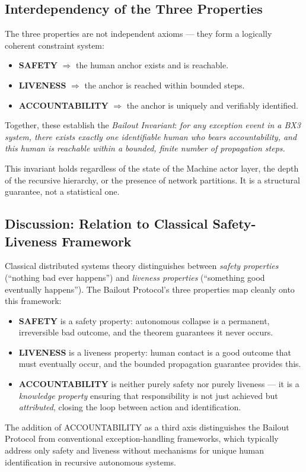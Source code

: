 \subsection{Interdependency of the Three Properties}

The three properties are not independent axioms — they form a logically coherent constraint system:

\begin{itemize}
    \item \textbf{SAFETY} $\Rightarrow$ the human anchor exists and is reachable.
    \item \textbf{LIVENESS} $\Rightarrow$ the anchor is reached within bounded steps.
    \item \textbf{ACCOUNTABILITY} $\Rightarrow$ the anchor is uniquely and verifiably identified.
\end{itemize}

Together, these establish the \emph{Bailout Invariant}: \emph{for any exception event in a BX3 system, there exists exactly one identifiable human who bears accountability, and this human is reachable within a bounded, finite number of propagation steps.}

This invariant holds regardless of the state of the Machine actor layer, the depth of the recursive hierarchy, or the presence of network partitions. It is a structural guarantee, not a statistical one.

\subsection{Discussion: Relation to Classical Safety-Liveness Framework}

Classical distributed systems theory distinguishes between \emph{safety properties} (``nothing bad ever happens'') and \emph{liveness properties} (``something good eventually happens''). The Bailout Protocol's three properties map cleanly onto this framework:

\begin{itemize}
    \item \textbf{SAFETY} is a safety property: autonomous collapse is a permanent, irreversible bad outcome, and the theorem guarantees it never occurs.
    \item \textbf{LIVENESS} is a liveness property: human contact is a good outcome that must eventually occur, and the bounded propagation guarantee provides this.
    \item \textbf{ACCOUNTABILITY} is neither purely safety nor purely liveness — it is a \emph{knowledge property} ensuring that responsibility is not just achieved but \emph{attributed}, closing the loop between action and identification.
\end{itemize}

The addition of ACCOUNTABILITY as a third axis distinguishes the Bailout Protocol from conventional exception-handling frameworks, which typically address only safety and liveness without mechanisms for unique human identification in recursive autonomous systems.

